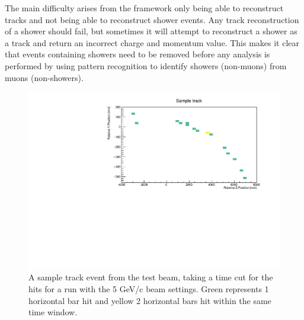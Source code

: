 The main difficulty arises from the framework only being able to reconstruct tracks and not being able to reconstruct shower events. Any track reconstruction of a shower should fail, but sometimes it will attempt to reconstruct a shower as a track and return an incorrect charge and momentum value. This makes it clear that events containing showers need to be removed before any analysis is performed by using pattern recognition to identify showers (non-muons) from muons (non-showers).

\begin{figure}[h!]
\centering
\includegraphics[width=\textwidth]{figures/SampleTrack5GeVYZ.pdf}
\caption{A sample track event from the test beam, taking a time cut for the hits for a run with the 5 GeV/c beam settings. Green represents 1 horizontal bar hit and yellow 2 horizontal bars hit within the same time window.}
\label{fig:event}
\end{figure}

